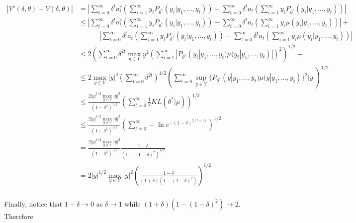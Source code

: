 \documentclass{article}
\begin{document}
\[
  \begin{split}
  |V^c(\delta, \theta) - V(\delta, \theta)| & = \left|
      \sum_{t=0}^{\infty} \delta^t a^c_t 
        \left(\sum_{i = 1}^{\infty} y_i P_{\theta^*}(y_i|y_1, \ldots, y_t)\right) - 
      \sum_{t=0}^{\infty} \delta^t a_t 
        \left(\sum_{i = 1}^{\infty} y_i P_{\theta^*}(y_i|y_1, \ldots, y_t)\right)
      \right| \\
    & \le \left|
        \sum_{t=0}^{\infty} \delta^t a^c_t 
          \left(\sum_{i = 1}^{\infty} y_i P_{\theta^*}(y_i|y_1, \ldots, y_t)\right) - 
        \sum_{t=0}^{\infty} \delta^t a_t 
          \left(\sum_{i = 1}^{\infty} y_i \mu(y_i|y_1, \ldots, y_t)\right)
        \right| + \\ 
      & \qquad\quad \left|
        \sum_{t=0}^{\infty} \delta^t a_t 
          \left(\sum_{i = 1}^{\infty} y_i P_{\theta^*}(y_i|y_1, \ldots, y_t)\right) - 
        \sum_{t=0}^{\infty} \delta^t a_t 
          \left(\sum_{i = 1}^{\infty} y_i \mu(y_i|y_1, \ldots, y_t)\right)
        \right| \\
    & \le 2\left(
        \sum_{t=0}^{\infty} \delta^{2t} \max_{y \in Y} y^2
            \left(\sum_{i = 1}^{\infty} |
                P_{\theta^*}(y_i|y_1, \ldots, y_t)
                \mu(y_i|y_1, \ldots, y_t)|\right)^2\right)^{1/2} + \\
    & \le 2\max_{y \in Y} |y|^2 \left(\sum_{t = 0}^{\infty} \delta^{2t}\right)^{1/2} 
        \left(\sum_{t = 0}^{\infty} \sup_{y \in Y}\{
            P_{\theta^*}(y|y_1, \ldots, y_t)
                \mu(y|y_1, \ldots, y_t)\}^2 |y|\right)^{1/2} \\
    & \le \frac{2|y|^{1/2}\max_{y \in Y} |y|^2}{(1 - \delta^2)^{1/2}} 
        \left(\sum_{t=0}^{\infty} \frac{1}{2}KL(\theta^*|\mu)\right)^{1/2} \\
    & \le \frac{2|y|^{1/2}\max_{y \in Y} |y|^2}{(1 - \delta^2)^{1/2}} 
        \left(\sum_{t=0}^{\infty} -\ln e^{-(1 -\delta)^{2(t+1)}}\right)^{1/2} \\
    & = \frac{2|y|^{1/2}\max_{y \in Y} |y|^2}{(1 - \delta^2)^{1/2}} 
        \frac{1 -\delta}{(1 - (1 - \delta)^2)^{1/2}} \\
    & = 2|y|^{1/2}\max_{y \in Y} |y|^2
        \left(\frac{1 -\delta}{(1 + \delta)(1 - (1 - \delta)^2)}\right)^{1/2} \\
  \end{split}
\]

Finally, notice that $1 - \delta \to 0$ as $\delta \to 1$ while
$(1 + \delta)(1 - (1 - \delta)^2) \to 2$. Therefore
\end{document}
